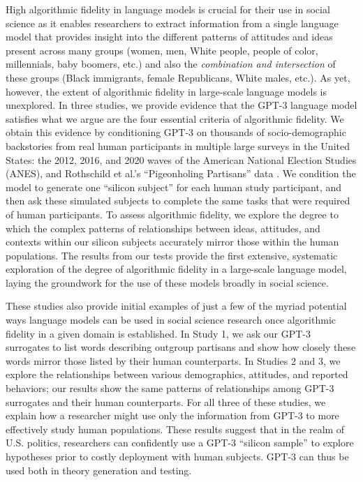 \documentclass[11pt]{article}
\begin{document}
High algorithmic fidelity in language models is crucial for their use in social science as it enables researchers to extract information from a single language model that provides insight into the different patterns of attitudes and ideas present across many groups (women, men, White people, people of color, millennials, baby boomers, etc.) and also the \emph{combination and intersection} of these groups (Black immigrants, female Republicans, White males, etc.). As yet, however, the extent of algorithmic fidelity in large-scale language models is unexplored. In three studies, we provide evidence that the GPT-3 language model \citep{brown2020language} satisfies what we argue are the four essential criteria of algorithmic fidelity. We obtain this evidence by conditioning GPT-3 on thousands of socio-demographic backstories from real human participants in multiple large surveys in the United States: the 2012, 2016, and 2020 waves of the American National Election Studies (ANES)\citep{anes}, and Rothschild et al.'s ``Pigeonholing Partisans'' data \citep{busby2019}. We condition the model to generate one ``silicon subject'' for each human study participant, and then ask these simulated subjects to complete the same tasks that were required of human participants. To assess algorithmic fidelity, we explore the degree to which the complex patterns of relationships between ideas, attitudes, and contexts within our silicon subjects accurately mirror those within the human populations. The results from our tests provide the first extensive, systematic exploration of the degree of algorithmic fidelity in a large-scale language model, laying the groundwork for the use of these models broadly in social science.

These studies also provide initial examples of just a few of the myriad potential ways language models can be used in social science research once algorithmic fidelity in a given domain is established. In Study 1, we ask our GPT-3 surrogates to list words describing outgroup partisans and show how closely these words mirror those listed by their human counterparts. In Studies 2 and 3, we explore the relationships between various demographics, attitudes, and reported behaviors; our results show the same patterns of relationships among GPT-3 surrogates and their human counterparts. For all three of these studies, we explain how a researcher might use only the information from GPT-3 to more effectively study human populations. These results suggest that in the realm of U.S. politics, researchers can confidently use a GPT-3 ``silicon sample'' to explore hypotheses prior to costly deployment with human subjects. GPT-3 can thus be used both in theory generation and testing. %
\end{document}
